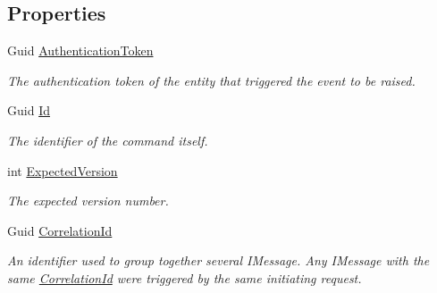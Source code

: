 \subsection*{Properties}
\begin{DoxyCompactItemize}
\item 
Guid \hyperlink{classCqrs_1_1Azure_1_1ServiceBus_1_1Tests_1_1Unit_1_1TestCommand_a98a038b33bcbfad2511543326906731c_a98a038b33bcbfad2511543326906731c}{Authentication\+Token}
\begin{DoxyCompactList}\small\item\em The authentication token of the entity that triggered the event to be raised. \end{DoxyCompactList}\item 
Guid \hyperlink{classCqrs_1_1Azure_1_1ServiceBus_1_1Tests_1_1Unit_1_1TestCommand_a77486cace45920a8478bc6e8c8fd50c2_a77486cace45920a8478bc6e8c8fd50c2}{Id}
\begin{DoxyCompactList}\small\item\em The identifier of the command itself. \end{DoxyCompactList}\item 
int \hyperlink{classCqrs_1_1Azure_1_1ServiceBus_1_1Tests_1_1Unit_1_1TestCommand_a58e0bae017d2975548504adfb927d00d_a58e0bae017d2975548504adfb927d00d}{Expected\+Version}
\begin{DoxyCompactList}\small\item\em The expected version number. \end{DoxyCompactList}\item 
Guid \hyperlink{classCqrs_1_1Azure_1_1ServiceBus_1_1Tests_1_1Unit_1_1TestCommand_a1e92c111a69561faef294cd04839f236_a1e92c111a69561faef294cd04839f236}{Correlation\+Id}
\begin{DoxyCompactList}\small\item\em An identifier used to group together several I\+Message. Any I\+Message with the same \hyperlink{classCqrs_1_1Azure_1_1ServiceBus_1_1Tests_1_1Unit_1_1TestCommand_a1e92c111a69561faef294cd04839f236_a1e92c111a69561faef294cd04839f236}{Correlation\+Id} were triggered by the same initiating request. \end{DoxyCompactList}\item 

\end{DoxyCompactItemize}
